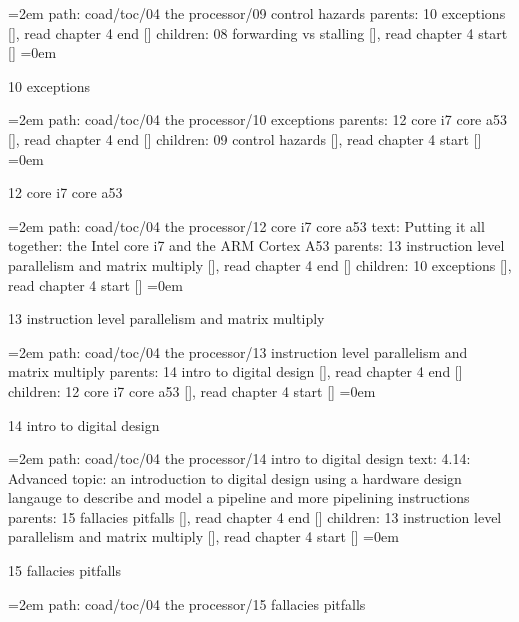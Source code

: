 \leftskip=2em
path: coad/toc/04 the processor/09 control hazards
\smallskip
parents:  10 exceptions [], read chapter 4 end []
\smallskip
children: 08 forwarding vs stalling [], read chapter 4 start []
\smallskip
\leftskip=0em
\par\endgroup
\bigskip
{}
10 exceptions
\smallskip
\par\begingroup
\leftskip=2em
path: coad/toc/04 the processor/10 exceptions
\smallskip
parents:  12 core i7 core a53 [], read chapter 4 end []
\smallskip
children: 09 control hazards [], read chapter 4 start []
\smallskip
\leftskip=0em
\par\endgroup
\bigskip
{}
12 core i7 core a53
\smallskip
\par\begingroup
\leftskip=2em
path: coad/toc/04 the processor/12 core i7 core a53
\smallskip
text:  Putting it all together: the Intel core i7 and the ARM Cortex A53
\smallskip
parents:  13 instruction level parallelism and matrix multiply [], read chapter 4 end []
\smallskip
children: 10 exceptions [], read chapter 4 start []
\smallskip
\leftskip=0em
\par\endgroup
\bigskip
{}
13 instruction level parallelism and matrix multiply
\smallskip
\par\begingroup
\leftskip=2em
path: coad/toc/04 the processor/13 instruction level parallelism and matrix multiply
\smallskip
parents:  14 intro to digital design [], read chapter 4 end []
\smallskip
children: 12 core i7 core a53 [], read chapter 4 start []
\smallskip
\leftskip=0em
\par\endgroup
\bigskip
{}
14 intro to digital design
\smallskip
\par\begingroup
\leftskip=2em
path: coad/toc/04 the processor/14 intro to digital design
\smallskip
text:  4.14: Advanced topic: an introduction to digital design using a hardware design langauge to describe and model a pipeline and more pipelining instructions
\smallskip
parents:  15 fallacies pitfalls [], read chapter 4 end []
\smallskip
children: 13 instruction level parallelism and matrix multiply [], read chapter 4 start []
\smallskip
\leftskip=0em
\par\endgroup
\bigskip
{}
15 fallacies pitfalls
\smallskip
\par\begingroup
\leftskip=2em
path: coad/toc/04 the processor/15 fallacies pitfalls
